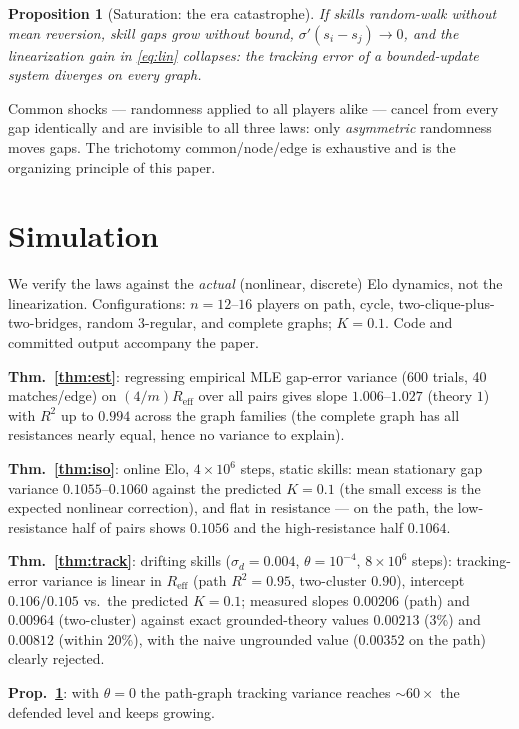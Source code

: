 \documentclass[11pt]{article}
\newtheorem{proposition}{Proposition}
\newcommand{\Reff}{R_{\mathrm{eff}}}
\begin{document}
\begin{proposition}[Saturation: the era catastrophe]\label{prop:sat}
If skills random-walk without mean reversion, skill gaps grow without
bound, $\sigma'(s_i - s_j) \to 0$, and the linearization gain in
\eqref{eq:lin} collapses: the tracking error of a bounded-update system
diverges on every graph.
\end{proposition}

Common shocks --- randomness applied to all players alike --- cancel from
every gap identically and are invisible to all three laws: only
\emph{asymmetric} randomness moves gaps. The trichotomy
common/node/edge is exhaustive and is the organizing principle of this
paper.

\section{Simulation}\label{sec:sim}

We verify the laws against the \emph{actual} (nonlinear, discrete) Elo
dynamics, not the linearization. Configurations: $n = 12$--$16$ players on
path, cycle, two-clique-plus-two-bridges, random 3-regular, and complete
graphs; $K = 0.1$. Code and committed output accompany the paper.

\textbf{Thm.~\ref{thm:est}}: regressing empirical MLE gap-error variance
(600 trials, 40 matches/edge) on $(4/m)\Reff$ over all pairs gives slope
$1.006$--$1.027$ (theory $1$) with $R^2$ up to $0.994$ across the graph
families (the complete graph has all resistances nearly equal, hence no
variance to explain).

\textbf{Thm.~\ref{thm:iso}}: online Elo, $4 \times 10^6$ steps, static
skills: mean stationary gap variance $0.1055$--$0.1060$ against the
predicted $K = 0.1$ (the small excess is the expected nonlinear
correction), and flat in resistance --- on the path, the low-resistance
half of pairs shows $0.1056$ and the high-resistance half $0.1064$.

\textbf{Thm.~\ref{thm:track}}: drifting skills ($\sigma_d = 0.004$,
$\theta = 10^{-4}$, $8\times10^6$ steps): tracking-error variance is
linear in $\Reff$ (path $R^2 = 0.95$, two-cluster $0.90$), intercept
$0.106/0.105$ vs.\ the predicted $K = 0.1$; measured slopes $0.00206$
(path) and $0.00964$ (two-cluster) against exact grounded-theory values
$0.00213$ (3\%) and $0.00812$ (within 20\%), with the naive ungrounded
value ($0.00352$ on the path) clearly rejected.

\textbf{Prop.~\ref{prop:sat}}: with $\theta = 0$ the path-graph tracking
variance reaches ${\sim}60\times$ the defended level and keeps growing.
\end{document}
